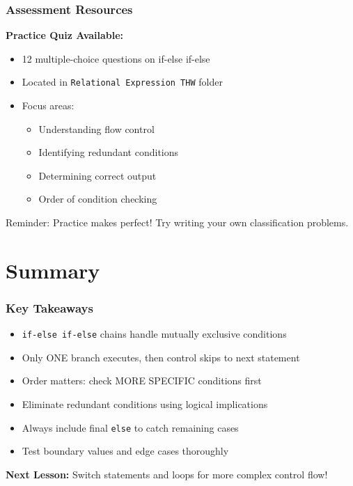 \documentclass{beamer}
\begin{document}
\begin{frame}
\frametitle{Assessment Resources}
\textbf{Practice Quiz Available:}
\begin{itemize}
    \item 12 multiple-choice questions on if-else if-else
    \item Located in \texttt{Relational Expression THW} folder
    \item Focus areas:
    \begin{itemize}
        \item Understanding flow control
        \item Identifying redundant conditions
        \item Determining correct output
        \item Order of condition checking
    \end{itemize}
\end{itemize}

\vspace{0.3cm}
\alert{Reminder:} Practice makes perfect! Try writing your own classification problems.
\end{frame}

\section{Summary}

\begin{frame}
\frametitle{Key Takeaways}
\begin{itemize}
    \item \texttt{if-else if-else} chains handle mutually exclusive conditions\pause
    \item Only ONE branch executes, then control skips to next statement\pause
    \item Order matters: check MORE SPECIFIC conditions first\pause
    \item Eliminate redundant conditions using logical implications\pause
    \item Always include final \texttt{else} to catch remaining cases\pause
    \item Test boundary values and edge cases thoroughly
\end{itemize}

\vspace{0.5cm}
\textbf{Next Lesson:} Switch statements and loops for more complex control flow!
\end{frame}
\end{document}
